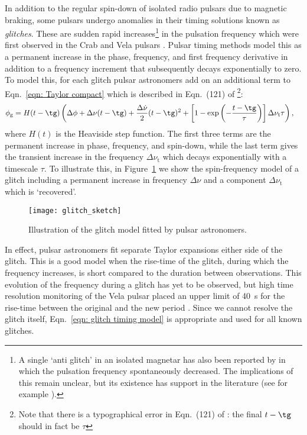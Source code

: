 In addition to the regular spin-down of isolated radio pulsars due to magnetic
braking,
some pulsars undergo anomalies in their timing solutions known as
\emph{glitches}.  These are sudden rapid increases\footnote{A single `anti glitch'
in an isolated magnetar has also been reported by \citet{archibald2013anti} in
which the pulsation frequency spontaneously decreased. The implications of this
remain unclear, but its existence has support in the literature (see for example
\citet{hu2014glitch}).}
 in the pulsation frequency
which were first observed in the Crab \citep{Boynton1969, Richards1969} and
Vela pulsars \citep{RadhakrishnanManchester1969, Reichley1969}. Pulsar
timing methods model this as a permanent increase in the phase, frequency, and
first frequency derivative in addition to a frequency increment that
subsequently decays exponentially to zero.  To model this,
for each glitch pulsar astronomers add on an additional term to
Eqn.~\eqref{eqn: Taylor compact} which is described in
Eqn.~(121) of \citet{Edwards2006}\footnote{Note that there is a typographical
error in Eqn.~(121) of \citet{Edwards2006}: the final $t-\tg$ should in fact
be $\tau$}:
\begin{align}
\begin{split}
\phi_{\textrm{g}} = H(t - \tg)& {}\left(
\Delta\phi + \Delta\nu(t - \tg) + \frac{\Delta\dot{\nu}}{2}(t - \tg)^{2}
+ \left[1-\exp\left(-\frac{t - \tg}{\tau}\right)\right]
\Delta\nu_{\textrm{t}}\tau
\right),
\end{split}
\label{eqn: glitch timing model}
\end{align}
where $H(t)$ is the Heaviside step function. The first
three terms are the permanent increase in phase, frequency, and spin-down,
while the last term gives the transient increase in the frequency
$\Delta\nu_{\textrm{t}}$ which decays exponentially with a timescale $\tau$.
To illustrate this, in Figure~\ref{fig: glitch sketch} we show the spin-frequency
model of a glitch including a permanent increase in frequency $\Delta\nu$ and
a component $\Delta\nu_{\textrm{t}}$ which is `recovered'.
\begin{figure}[htb]
\centering
\texttt{[image: glitch\_sketch]}
\caption{Illustration of the glitch model fitted by pulsar astronomers.}
\label{fig: glitch sketch}
\end{figure}

In effect, pulsar astronomers fit separate Taylor expansions either side of the
glitch. This is a good model when the rise-time of the glitch, during which the
frequency increases, is short compared to the duration between observations.
This evolution of the frequency during a glitch has yet to be observed, but
high time resolution monitoring of the Vela pulsar placed an upper limit of
40~s for the rise-time between the original and the new period
\citep{Dodson2001}. Since we cannot resolve the glitch itself,
Eqn.~\eqref{eqn: glitch timing model} is appropriate and used for all known
glitches.

